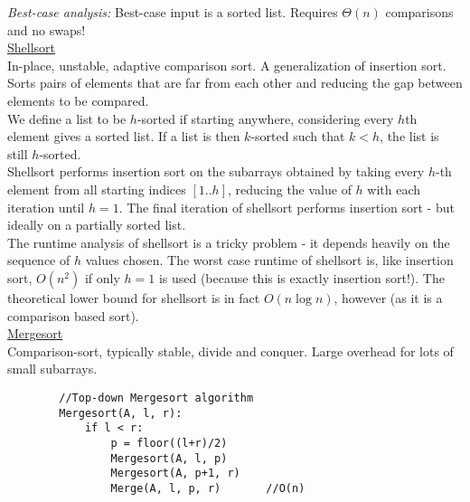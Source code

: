 \documentclass[12pt, fleqn]{general}
\begin{document}
\begin{multicols*}{2}
    \emph{Best-case analysis:} Best-case input is a sorted list. Requires $\Theta(n)$ comparisons and no swaps!\\

    {\large \underline{Shellsort}}\\

    In-place, unstable, adaptive comparison sort. A generalization of insertion sort. Sorts pairs of elements that are far from each other and reducing the gap between elements to be compared.\\

    We define a list to be $h$-sorted if starting anywhere, considering every $h$th element gives a sorted list. If a list is then $k$-sorted such that $k < h$, the list is still $h$-sorted.\\

    Shellsort performs insertion sort on the subarrays obtained by taking every $h$-th element from all starting indices $[1..h]$, reducing the value of $h$ with each iteration until $h = 1$. The final iteration of shellsort performs insertion sort - but ideally on a partially sorted list.\\

    The runtime analysis of shellsort is a tricky problem - it depends heavily on the sequence of $h$ values chosen. The worst case runtime of shellsort is, like insertion sort, $O(n^2)$ if only $h=1$ is used (because this is exactly insertion sort!). The theoretical lower bound for shellsort is in fact $O(n\log n)$, however (as it is a comparison based sort).\\


    {\large \underline{Mergesort}}\\

    Comparison-sort, typically stable, divide and conquer. Large overhead for lots of small subarrays.

    \begin{framed}
    \begingroup
    \makeatletter
    \@totalleftmargin=-1.5cm
    \begin{verbatim}
        //Top-down Mergesort algorithm
        Mergesort(A, l, r):
            if l < r:
                p = floor((l+r)/2)
                Mergesort(A, l, p)
                Mergesort(A, p+1, r)
                Merge(A, l, p, r)       //O(n)
    \end{verbatim}
    \makeatother
    \endgroup
    \end{framed}


\end{multicols*}
\end{document}
